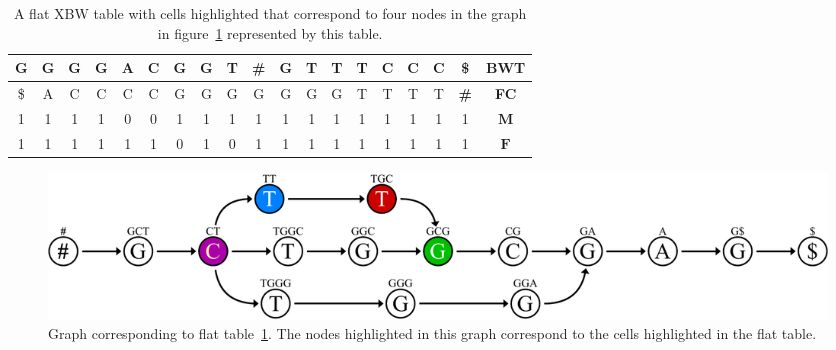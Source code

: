 \documentclass[a4paper,12pt,twoside,BCOR=10mm]{scrbook}
\begin{document}
{
\begin{table}[htb]
\centering
\caption[Flat table corresponding to a graph]{A flat XBW table with cells highlighted that correspond to four nodes in the graph in figure~\ref{fig:evo_fig_flat_table_with_ct} represented by this table.}
\begin{tabular}{ | c | c | c | c | c | c | c | c | c | c | c | c | c | c | c | c | c | c | c | }
\hline
G & G & G &\cellcolor{purple_bg}\color{purple_fx}G & A & C & G &\cellcolor{green_bg}\color{green_fx}G &\cellcolor{green_bg}\color{green_fx}T & \textbf{\#} & G & T & T &\cellcolor{red_bg}\color{red_fx}T & C & C &\cellcolor{blue_bg}\color{blue_fx}C & \$ & \textbf{BWT} \\ \hline 
\$ & A & C &\cellcolor{purple_bg}\color{purple_fx}C &\cellcolor{purple_bg}\color{purple_fx}C &\cellcolor{purple_bg}\color{purple_fx}C & G & G &\cellcolor{green_bg}\color{green_fx}G & G & G & G & G &\cellcolor{red_bg}\color{red_fx}T & T & T &\cellcolor{blue_bg}\color{blue_fx}T & \textbf{\#} & \textbf{FC} \\ \hline 
1 & 1 & 1 &\cellcolor{purple_bg}\color{purple_fx}1 &\cellcolor{purple_bg}\color{purple_fx}0 &\cellcolor{purple_bg}\color{purple_fx}0 & 1 & 1 &\cellcolor{green_bg}\color{green_fx}1 & 1 & 1 & 1 & 1 &\cellcolor{red_bg}\color{red_fx}1 & 1 & 1 &\cellcolor{blue_bg}\color{blue_fx}1 & 1 & $\boldsymbol{M}$ \\ \hline 
1 & 1 & 1 &\cellcolor{purple_bg}\color{purple_fx}1 & 1 & 1 & 0 &\cellcolor{green_bg}\color{green_fx}1 &\cellcolor{green_bg}\color{green_fx}0 & 1 & 1 & 1 & 1 &\cellcolor{red_bg}\color{red_fx}1 & 1 & 1 &\cellcolor{blue_bg}\color{blue_fx}1 & 1 & $\boldsymbol{F}$ \\ \hline 
\end{tabular}
\label{table:flat_table_with_ct}
\end{table}
}
\begin{figure}[!htb]
\centering
\includegraphics[width=\textwidth]{evo_fig_flat_table_with_ct.pdf}
\caption[Graph corresponding to a flat table]{Graph corresponding to flat table~\ref{table:flat_table_with_ct}. The nodes highlighted in this graph correspond to the cells highlighted in the flat table.} \label{fig:evo_fig_flat_table_with_ct}
\end{figure}
\end{document}
